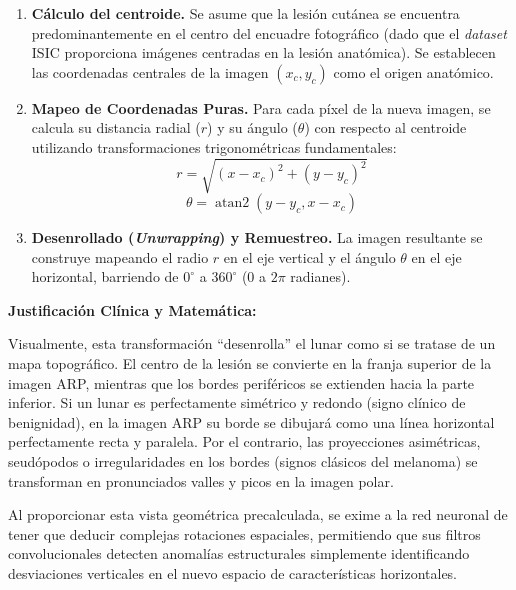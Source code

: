 \begin{enumerate}
	\item \textbf{Cálculo del centroide.} Se asume que la lesión cutánea se encuentra predominantemente en el centro del encuadre fotográfico (dado que el \textit{dataset} ISIC proporciona imágenes centradas en la lesión anatómica). Se establecen las coordenadas centrales de la imagen $(x_c, y_c)$ como el origen anatómico.
	
	\item \textbf{Mapeo de Coordenadas Puras.} Para cada píxel de la nueva imagen, se calcula su distancia radial ($r$) y su ángulo ($\theta$) con respecto al centroide utilizando transformaciones trigonométricas fundamentales:
	\begin{equation}
		r = \sqrt{(x - x_c)^2 + (y - y_c)^2}
	\end{equation}
	\begin{equation}
		\theta = \operatorname{atan2}(y - y_c, x - x_c)
	\end{equation}
	
	\item \textbf{Desenrollado (\textit{Unwrapping}) y Remuestreo.} La imagen resultante se construye mapeando el radio $r$ en el eje vertical y el ángulo $\theta$ en el eje horizontal, barriendo de $0^\circ$ a $360^\circ$ ($0$ a $2\pi$ radianes).
\end{enumerate}

\textbf{Justificación Clínica y Matemática:}

Visualmente, esta transformación ``desenrolla'' el lunar como si se tratase de un mapa topográfico. El centro de la lesión se convierte en la franja superior de la imagen ARP, mientras que los bordes periféricos se extienden hacia la parte inferior. Si un lunar es perfectamente simétrico y redondo (signo clínico de benignidad), en la imagen ARP su borde se dibujará como una línea horizontal perfectamente recta y paralela. Por el contrario, las proyecciones asimétricas, seudópodos o irregularidades en los bordes (signos clásicos del melanoma) se transforman en pronunciados valles y picos en la imagen polar.

Al proporcionar esta vista geométrica precalculada, se exime a la red neuronal de tener que deducir complejas rotaciones espaciales, permitiendo que sus filtros convolucionales detecten anomalías estructurales simplemente identificando desviaciones verticales en el nuevo espacio de características horizontales.

